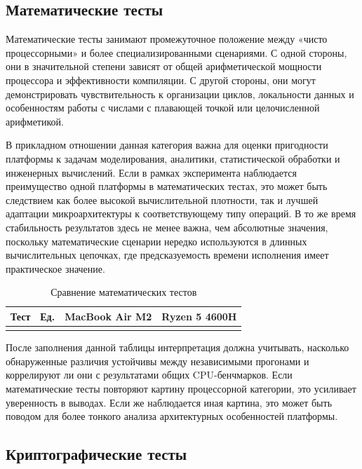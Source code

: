 \subsection{Математические тесты}

Математические тесты занимают промежуточное положение между «чисто процессорными» и более специализированными сценариями. С одной стороны, они в значительной степени зависят от общей арифметической мощности процессора и эффективности компиляции. С другой стороны, они могут демонстрировать чувствительность к организации циклов, локальности данных и особенностям работы с числами с плавающей точкой или целочисленной арифметикой.

В прикладном отношении данная категория важна для оценки пригодности платформы к задачам моделирования, аналитики, статистической обработки и инженерных вычислений. Если в рамках эксперимента наблюдается преимущество одной платформы в математических тестах, это может быть следствием как более высокой вычислительной плотности, так и лучшей адаптации микроархитектуры к соответствующему типу операций. В то же время стабильность результатов здесь не менее важна, чем абсолютные значения, поскольку математические сценарии нередко используются в длинных вычислительных цепочках, где предсказуемость времени исполнения имеет практическое значение.

\begin{table}[!htbp]
\centering
\caption{Сравнение математических тестов}
\label{tab:math_compare}
\begin{tabular}{|l|c|c|c|}
\hline
\textbf{Тест} & \textbf{Ед.} & \textbf{MacBook Air M2} & \textbf{Ryzen 5 4600H} \\
\hline
 &  &  &  \\
\hline
\end{tabular}
\end{table}

\noindent После заполнения данной таблицы интерпретация должна учитывать, насколько обнаруженные различия устойчивы между независимыми прогонами и коррелируют ли они с результатами общих CPU-бенчмарков. Если математические тесты повторяют картину процессорной категории, это усиливает уверенность в выводах. Если же наблюдается иная картина, это может быть поводом для более тонкого анализа архитектурных особенностей платформы.

\subsection{Криптографические тесты}

